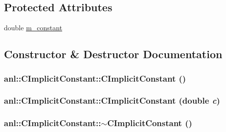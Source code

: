 \subsection*{Protected Attributes}
\begin{DoxyCompactItemize}
\item 
double \hyperlink{classanl_1_1CImplicitConstant_af01da7bdcbf17e65c6d7148fed49e82d}{m\_\-constant}
\end{DoxyCompactItemize}


\subsection{Constructor \& Destructor Documentation}
\hypertarget{classanl_1_1CImplicitConstant_a0df33e85702832acc0443e2f307e87aa}{
\subsubsection[{CImplicitConstant}]{\setlength{\rightskip}{0pt plus 5cm}anl::CImplicitConstant::CImplicitConstant ()}}
\label{classanl_1_1CImplicitConstant_a0df33e85702832acc0443e2f307e87aa}
\hypertarget{classanl_1_1CImplicitConstant_ac9df95572ab892cc52d64f7c44a89a8a}{
\subsubsection[{CImplicitConstant}]{\setlength{\rightskip}{0pt plus 5cm}anl::CImplicitConstant::CImplicitConstant (double {\em c})}}
\label{classanl_1_1CImplicitConstant_ac9df95572ab892cc52d64f7c44a89a8a}
\hypertarget{classanl_1_1CImplicitConstant_a3dedc6f805613ae4cfb763ac0aaff622}{
\subsubsection[{$\sim$CImplicitConstant}]{\setlength{\rightskip}{0pt plus 5cm}anl::CImplicitConstant::$\sim$CImplicitConstant ()}}
\label{classanl_1_1CImplicitConstant_a3dedc6f805613ae4cfb763ac0aaff622}


